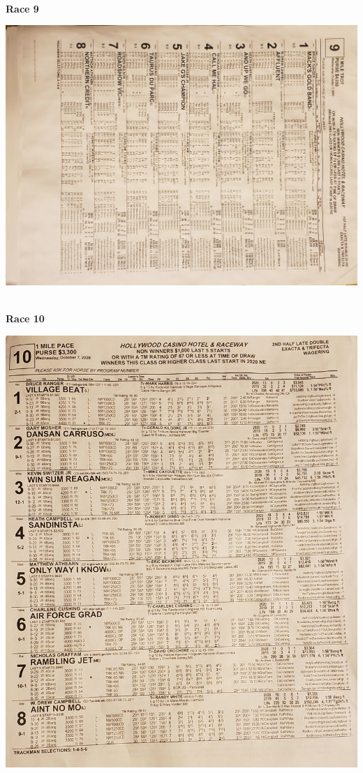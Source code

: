 \documentclass{article}
\begin{document}
\newpage
\begin{center}
\small{~\\}
\textbf{\LARGE{\textcolor[rgb]{0,0,0}{Race 9 }}}\\
\begin{turn}{90}
\includegraphics[scale=0.10]{race09.jpg}
\end{turn}
\end{center}

\newpage
\begin{center}
\small{~\\}
\textbf{\LARGE{\textcolor[rgb]{0,0,0}{Race 10 }}}\\
\begin{turn}{0}
\includegraphics[scale=0.12]{race10.jpg}
\end{turn}
\end{center}
\end{document}
